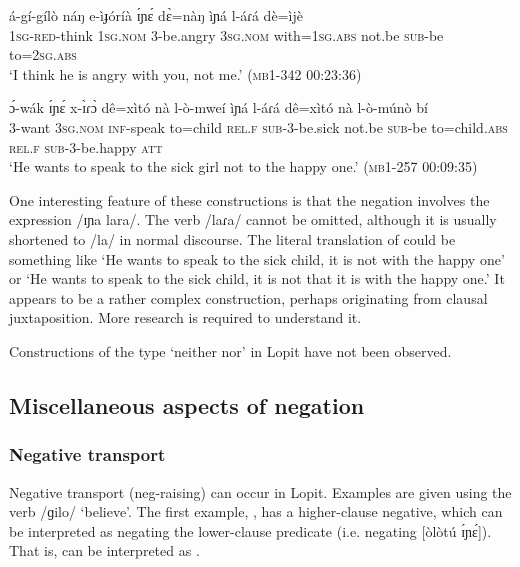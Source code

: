 \documentclass[output=paper,colorlinks,citecolor=brown,draftmode]{langscibook}
\begin{document}
\ea\label{ex:lop:105}
        \gll á-gí-gílò náŋ e-ìɟóríà ɪ́ɲɛ́ dɛ̀=nàŋ    ìɲá l-áɾá dè=ìjè   \\
             1\textsc{sg-red-}think 1\textsc{sg.nom} 3-be.angry \textsc{3sg.nom} {with=1\textsc{sg.abs}} not.be \textsc{sub}{}-be  {to=2\textsc{sg.abs}} \\
        \glt ‘I think he is angry with you, not me.’ (\textsc{mb1-342} 00:23:36)
\z

\ea\label{ex:lop:106}
        \gll ɔ́-wák ɪ́ɲɛ́ x-ɪ̀ɾɔ̀ dê=xìtó nà l-ò-mweí ìɲá l-áɾá dê=xìtó nà l-ò-múnò bí \\ 
             3-want \textsc{3sg.nom} \textsc{inf}{}-speak to=child \textsc{rel.f} \textsc{sub}{}-3-be.sick not.be \textsc{sub}{}-be to=child.\textsc{abs} \textsc{rel.f} \textsc{sub}{}-3-be.happy \textsc{att} \\
        \glt ‘He wants to speak to the sick girl not to the happy one.’        (\textsc{mb1-257} \textsc{00:}09:35)
\z

One interesting feature of these constructions is that the negation involves the expression /ɪɲa lara/. The verb /laɾa/ cannot be omitted, although it is usually shortened to /la/ in normal discourse. The literal translation of  could be something like ‘He wants to speak to the sick child, it is not with the happy one’ or ‘He wants to speak to the sick child, it is not that it is with the happy one.’ It appears to be a rather complex construction, perhaps originating from clausal juxtaposition. More research is required to understand it.

Constructions of the type ‘neither nor’ in Lopit have not been observed.

\subsection{Miscellaneous aspects of negation}
\label{sec:lop:4.6}
\subsubsection{Negative transport}
\label{sec:lop:4.6.1}

Negative transport (neg-raising) can occur in Lopit. Examples are given using the verb /ɡilo/ ‘believe’. The first example, , has a higher-clause negative, which can be interpreted as negating the lower-clause predicate (i.e. negating [òlòtú ɪ́ɲɛ́]). That is,  can be interpreted as .
\end{document}
